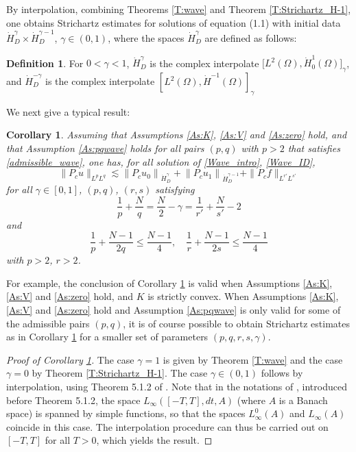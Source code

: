 \documentclass[10pt,leqno]{amsart}
\newtheorem{corollary}[theorem]{Corollary}
\theoremstyle{definition}%
\newtheorem{definition}[theorem]{Definition}
\theoremstyle{remark}
\numberwithin{equation}{section}
\renewcommand{\^}{\widehat}%
\begin{document}
By interpolation, combining Theorems \ref{T:wave} and Theorem \ref{T:Strichartz_H-1}, one obtains Strichartz estimates for solutions of equation (1.1) with initial data $\dot{H}^{\gamma}_D\times \dot{H}^{\gamma-1}_D$, $\gamma\in (0,1)$, where the spaces $\dot{H}^{\gamma}_D$ are defined as follows:
\begin{definition}
 For $0<\gamma<1$,  $\dot{H}^{\gamma}_D$ is the complex interpolate $\Big[L^2(\Omega),\dot{H}^1_0(\Omega)\Big]_{\gamma}$, and $\dot{H}^{-\gamma}_D$ is the complex interpolate $\left[L^2(\Omega),\dot{H}^{-1}(\Omega)\right]_{\gamma}$
\end{definition}
We next give a typical result:
\begin{corollary}
\label{cor:fractional}
Assuming that Assumptions \ref{As:K}, \ref{As:V} and \ref{As:zero} hold, and that Assumption \ref{As:pqwave} holds for all pairs $(p,q)$ with $p>2$ that satisfies \eqref{admissible_wave}, one has, for all solution of \eqref{Wave_intro}, \eqref{Wave_ID},
$$\|P_c u\|_{L^pL^q}\lesssim \left\|P_c u_0\right\|_{\dot{H}^{\gamma}_D}+\left\|P_c u_1\right\|_{\dot{H}^{\gamma-1}_D}+\|P_c f\|_{L^{r'}L^{s'}}$$
for all $\gamma\in [0,1]$, $(p,q)$, $(r,s)$ satisfying
\begin{equation}
 \label{cond1}
 \frac{1}{p}+\frac{N}{q}=\frac{N}{2}-\gamma=\frac{1}{r'}+\frac{N}{s'}-2
\end{equation} 
and
\begin{equation}
 \label{cond2}
 \frac{1}{p}+\frac{N-1}{2q}\leq \frac{N-1}{4},\quad
 \frac{1}{r}+\frac{N-1}{2s}\leq \frac{N-1}{4}
\end{equation}
with $p>2$, $r>2$.
\end{corollary}
For example, the conclusion of Corollary \ref{cor:fractional} is valid when  Assumptions \ref{As:K}, \ref{As:V} and \ref{As:zero} hold, and $K$ is strictly convex.
When Assumptions \ref{As:K}, \ref{As:V} and \ref{As:zero} hold and Assumption \ref{As:pqwave} is only valid for some of the admissible pairs $(p,q)$, it is of course possible to obtain Strichartz estimates as in Corollary \ref{cor:fractional} for a smaller set of parameters $(p,q,r,s,\gamma)$.
\begin{proof}[Proof of Corollary \ref{cor:fractional}]
 The case $\gamma=1$ is given by Theorem \ref{T:wave} and the case $\gamma=0$ by Theorem \ref{T:Strichartz_H-1}. The case $\gamma\in (0,1)$ follows by interpolation, using Theorem 5.1.2 of \cite{BerghLofstrom76BO}. Note that in the notations of \cite{BerghLofstrom76BO}, introduced before Theorem 5.1.2, the space  $L_{\infty}([-T,T],dt,A)$ (where $A$ is a Banach space) is spanned by simple functions, so that the spaces $L_{\infty}^0(A)$ and $L_{\infty}(A)$ coincide in this case. The interpolation procedure can thus be carried out on $[-T,T]$ for all $T>0$, which yields the result.
\end{proof}
\end{document}
